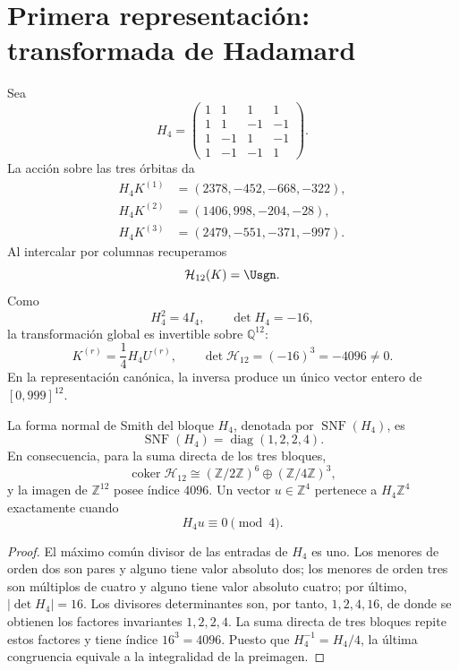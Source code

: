 \section{Primera representación: transformada de Hadamard}

Sea
\[
H_4=
\begin{pmatrix}
1&1&1&1\\
1&1&-1&-1\\
1&-1&1&-1\\
1&-1&-1&1
\end{pmatrix}.
\]
La acción sobre las tres órbitas da
\[
\begin{aligned}
H_4K^{(1)}&=(2378,-452,-668,-322),\\
H_4K^{(2)}&=(1406,998,-204,-28),\\
H_4K^{(3)}&=(2479,-551,-371,-997).
\end{aligned}
\]
Al intercalar por columnas recuperamos
\[
\mathcal H_{12}(K)=\Usgn.
\]
Como
\[
H_4^2=4I_4,
\qquad
\det H_4=-16,
\]
la transformación global es invertible sobre \(\mathbb Q^{12}\):
\[
K^{(r)}=\frac14H_4U^{(r)},
\qquad
\det\mathcal H_{12}=(-16)^3=-4096\ne0.
\]
En la representación canónica, la inversa produce un único vector entero de
\([0,999]^{12}\).

\begin{theorem}
\label{thm:smith-hadamard}
La forma normal de Smith del bloque \(H_4\), denotada por
\(\operatorname{SNF}(H_4)\), es
\[
 \operatorname{SNF}(H_4)=\operatorname{diag}(1,2,2,4).
\]
En consecuencia, para la suma directa de los tres bloques,
\[
 \operatorname{coker}\mathcal H_{12}
 \cong(\mathbb Z/2\mathbb Z)^6\oplus(\mathbb Z/4\mathbb Z)^3,
\]
y la imagen de \(\mathbb Z^{12}\) posee índice \(4096\). Un vector
\(u\in\mathbb Z^4\) pertenece a \(H_4\mathbb Z^4\) exactamente cuando
\[
 H_4u\equiv0\pmod 4.
\]
\end{theorem}

\begin{proof}
El máximo común divisor de las entradas de \(H_4\) es uno. Los menores de
orden dos son pares y alguno tiene valor absoluto dos; los menores de orden
tres son múltiplos de cuatro y alguno tiene valor absoluto cuatro; por
último, \(\lvert\det H_4\rvert=16\). Los divisores determinantes son,
por tanto, \(1,2,4,16\), de donde se obtienen los factores invariantes
\(1,2,2,4\). La suma directa de tres bloques repite estos factores y tiene
índice \(16^3=4096\). Puesto que \(H_4^{-1}=H_4/4\), la última
congruencia equivale a la integralidad de la preimagen.
\end{proof}

